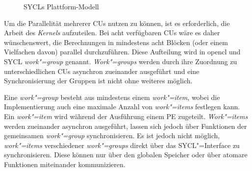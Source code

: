 \begin{figure}
    \caption{SYCLs Plattform-Modell \cite[nach][23]{opencl2012}}
    \label{sycl:konzepte:abstraktion:plattform}
\end{figure}

Um die Parallelität mehrerer CUs nutzen zu können, ist es erforderlich, die
Arbeit des \textit{Kernels} aufzuteilen. Bei acht verfügbaren CUs wäre es daher
wünschenswert, die Berechnungen in mindestens acht Blöcken (oder einem
Vielfachen davon) parallel durchzuführen. Diese Aufteilung wird in \gls{opencl}
und SYCL \textit{work"=group} genannt. \textit{Work"=groups} werden durch ihre
Zuordnung zu unterschiedlichen CUs asynchron zueinander ausgeführt und eine
Synchronisierung der Gruppen ist nicht ohne weiteres möglich.

Eine \textit{work"=group} besteht aus mindestens einem \textit{work"=item},
wobei die Implementierung auch eine maximale Anzahl von \textit{work"=items}
festlegen kann. Ein \textit{work"=item} wird während der Ausführung einem PE
zugeteilt. \textit{Work"=items} werden zueinander asynchron ausgeführt, lassen
sich jedoch über Funktionen der gemeinsamen \textit{work"=group}
synchronisieren. Es ist jedoch nicht möglich, \textit{work"=items} verschiedener
\textit{work"=groups} direkt über das SYCL"=Interface zu synchronisieren. Diese
können nur über den globalen Speicher oder über atomare Funktionen miteinander
kommunizieren.

